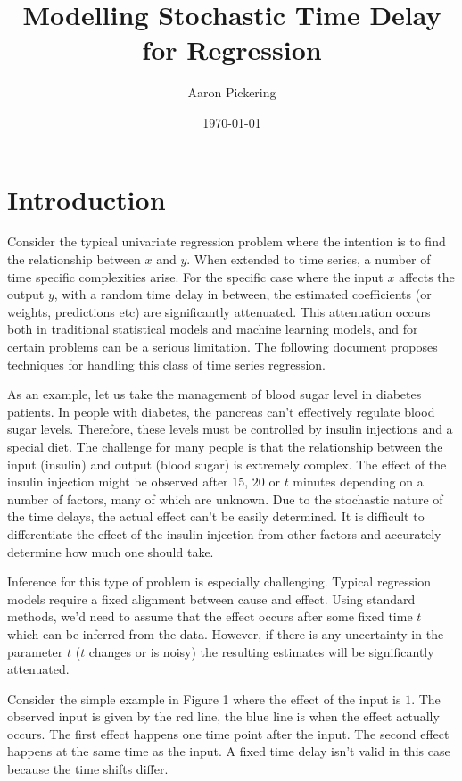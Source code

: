 \documentclass[11pt]{amsart}
\begin{document}
\title{Modelling Stochastic Time Delay for Regression}
\author{Aaron Pickering}
\date{\today}
\maketitle

\section{Introduction}

Consider the typical univariate regression problem where the intention is to find the relationship between $x$ and $y$. When extended to time series, a number of time specific complexities arise. For the specific case where the input $x$ affects the output $y$, with a random time delay in between, the estimated coefficients (or weights, predictions etc) are significantly attenuated. This attenuation occurs both in traditional statistical models and machine learning models, and for certain problems can be a serious limitation. The following document proposes techniques for handling this class of time series regression.

As an example, let us take the management of blood sugar level in diabetes patients. In people with diabetes, the pancreas can't effectively regulate blood sugar levels. Therefore, these levels must be controlled by insulin injections and a special diet. The challenge for many people is that the relationship between the input (insulin) and output (blood sugar) is extremely complex. The effect of the insulin injection might be observed after $15$, $20$  or $t$ minutes depending on a number of factors, many of which are unknown. Due to the stochastic nature of the time delays, the actual effect can't be easily determined. It is difficult to differentiate the effect of the insulin injection from other factors and accurately determine how much one should take.

Inference for this type of problem is especially challenging. Typical regression models require a fixed alignment between cause and effect. Using standard methods, we'd need to assume that the effect occurs after some fixed time $t$ which can be inferred from the data. However, if there is any uncertainty in the parameter $t$ ($t$ changes or is noisy) the resulting estimates will be significantly attenuated.

Consider the simple example in Figure 1 where the effect of the input is $1$. The observed input is given by the red line, the blue line is when the effect actually occurs. The first effect happens one time point after the input. The second effect happens at the same time as the input. A fixed time delay isn't valid in this case because the time shifts differ.
\end{document}
